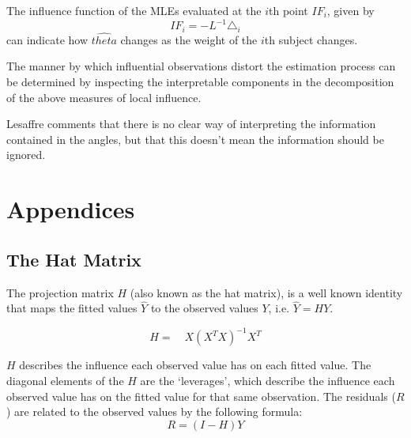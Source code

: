 The influence function of the MLEs evaluated at the $i$th point $IF_{i}$, given by
\begin{equation}
IF_{i} = -L^{-1}\triangle _{i}
\end{equation}
can indicate how $\hat{theta}$ changes as the weight of the $i$th
subject changes.

The manner by which influential observations distort the estimation process can be determined by inspecting the
interpretable components in the decomposition of the above measures of local influence.


Lesaffre comments that there is no clear way of interpreting the information contained in the angles, but that this doesn't mean the information should be ignored.


\chapter{Appendices} %
\newpage
\section{The Hat Matrix} %

The projection matrix $H$ (also known as the hat matrix), is a
well known identity that maps the fitted values $\hat{Y}$ to the
observed values $Y$, i.e. $\hat{Y} = HY$.

\begin{equation}
H =\quad X(X^{T}X)^{-1}X^{T}
\end{equation}

$H$ describes the influence each observed value has on each fitted
value. The diagonal elements of the $H$ are the `leverages', which
describe the influence each observed value has on the fitted value
for that same observation. The residuals ($R$) are related to the
observed values by the following formula:
\begin{equation}
R = (I-H)Y
\end{equation}

